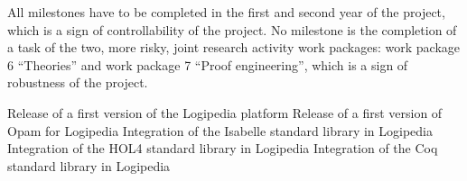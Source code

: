 All milestones have to be completed in the first and second year
of the project, which is a sign of controllability of the project.
No milestone is the completion of a
task of the two, more risky, joint research activity work packages:
work package 6 ``Theories'' and work package 7 ``Proof engineering'',
which is a sign of robustness of the project.
  



\begin{milestones}
  {Release of a first version of the Logipedia platform}
   {Release of a first version of Opam for Logipedia}
   {Integration of the Isabelle standard library in Logipedia}
   {Integration of the HOL4 standard library in Logipedia}
   {Integration of the Coq standard library in Logipedia}
\end{milestones}

